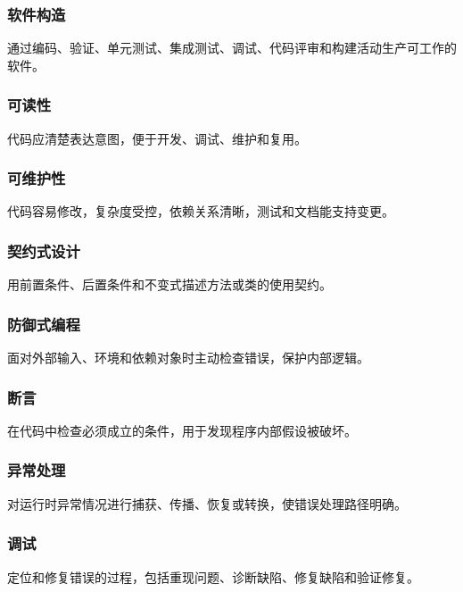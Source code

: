 \documentclass[UTF8,zihao=-4]{ctexart}
\begin{document}
\subsubsection*{软件构造}


通过编码、验证、单元测试、集成测试、调试、代码评审和构建活动生产可工作的软件。


\subsubsection*{可读性}


代码应清楚表达意图，便于开发、调试、维护和复用。


\subsubsection*{可维护性}


代码容易修改，复杂度受控，依赖关系清晰，测试和文档能支持变更。


\subsubsection*{契约式设计}


用前置条件、后置条件和不变式描述方法或类的使用契约。


\subsubsection*{防御式编程}


面对外部输入、环境和依赖对象时主动检查错误，保护内部逻辑。


\subsubsection*{断言}


在代码中检查必须成立的条件，用于发现程序内部假设被破坏。


\subsubsection*{异常处理}


对运行时异常情况进行捕获、传播、恢复或转换，使错误处理路径明确。


\subsubsection*{调试}


定位和修复错误的过程，包括重现问题、诊断缺陷、修复缺陷和验证修复。
\end{document}
